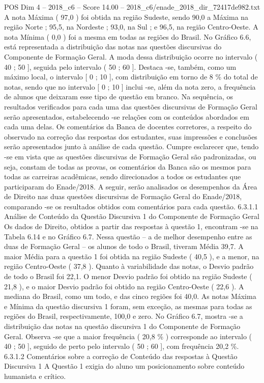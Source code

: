\begin{textsample}{POS Dim 4 – 2018\_c6 – Score 14.00 – 2018\_c6/enade\_2018\_dir\_72417de982.txt}
A nota Máxima ( 97,0 ) foi obtida na região Sudeste, sendo 90,0 a Máxima na região Norte ; 95,5, na Nordeste ; 93,0, na Sul ; e 96,5, na região Centro-Oeste.
A nota Mínima ( 0,0 ) foi a mesma em todas as regiões do Brasil.
No Gráfico 6.6, está representada a distribuição das notas nas questões discursivas do Componente de Formação Geral.
A moda dessa distribuição ocorre no intervalo ( 40 ; 50 ], seguida pelo intervalo ( 50 ; 60 ].
Destaca -se, também, como um máximo local, o intervalo [ 0 ; 10 ], com distribuição em torno de 8 \% do total de notas, sendo que no intervalo [ 0 ; 10 ] inclui -se, além da nota zero, a frequência de alunos que deixaram esse tipo de questão em branco.
Na sequência, os resultados verificados para cada uma das questões discursivas de Formação Geral serão apresentados, estabelecendo -se relações com os conteúdos abordados em cada uma delas.
Os comentários da Banca de docentes corretores, a respeito do observado na correção das respostas dos estudantes, suas impressões e conclusões serão apresentados junto à análise de cada questão.
Cumpre esclarecer que, tendo -se em vista que as questões discursivas de Formação Geral são padronizadas, ou seja, constam de todas as provas, os comentários da Banca são os mesmos para todas as carreiras acadêmicas, sendo direcionados a todos os estudantes que participaram do Enade/2018.
A seguir, serão analisados os desempenhos da Área de Direito nas duas questões discursivas de Formação Geral do Enade/2018, comparando -se os resultados obtidos com comentários para cada questão. 6.3.1.1 Análise de Conteúdo da Questão Discursiva 1 do Componente de Formação Geral Os dados de Direito, obtidos a partir das respostas à questão 1, encontram -se na Tabela 6.14 e no Gráfico 6.7.
Nessa questão – a de melhor desempenho entre as duas de Formação Geral – os alunos de todo o Brasil, tiveram Média 39,7.
A maior Média para a questão 1 foi obtida na região Sudeste ( 40,5 ), e a menor, na região Centro-Oeste ( 37,8 ).
Quanto à variabilidade das notas, o Desvio padrão de todo o Brasil foi 22,1.
O menor Desvio padrão foi obtido na região Sudeste ( 21,8 ), e o maior Desvio padrão foi obtido na região Centro-Oeste ( 22,6 ).
A mediana do Brasil, como um todo, e das cinco regiões foi 40,0.
As notas Máxima e Mínima da questão discursiva 1 foram, sem exceção, as mesmas para todas as regiões do Brasil, respectivamente, 100,0 e zero.
No Gráfico 6.7, mostra -se a distribuição das notas na questão discursiva 1 do Componente de Formação Geral.
Observa -se que a maior frequência ( 20,8 \% ) corresponde ao intervalo ( 40 ; 50 ], seguido de perto pelo intervalo ( 50 ; 60 ], com frequência 20,2 \%. 6.3.1.2 Comentários sobre a correção de Conteúdo das respostas à Questão Discursiva 1 A Questão 1 exigia do aluno um posicionamento sobre conteúdo humanista e crítico.

\end{textsample}
